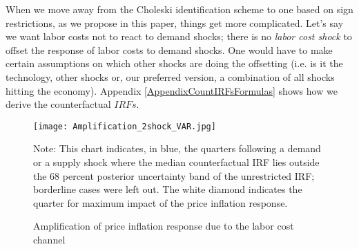 \documentclass[11pt]{article}
\begin{document}
When we move away from the Choleski identification scheme to one based on sign restrictions, as we propose in this paper, things get more complicated. Let's say we want labor costs not to react to demand shocks; there is no \textit{labor cost shock} to offset the response of labor costs to demand shocks. One would have to make certain assumptions on which other shocks are doing the offsetting (i.e. is it the technology, other shocks or, our preferred version, a combination of all shocks hitting the economy). Appendix \ref{AppendixCountIRFsFormulas} shows how we derive the counterfactual $IRFs$.



\begin{figure}
\begin{center}
\caption{Amplification of price inflation response due to the labor cost channel}

\smallskip
\texttt{[image: Amplification\_2shock\_VAR.jpg]}\label{fig:2ShockVAR_CounterIRF}
 \begin{minipage}{\textwidth} {\footnotesize
 Note: This chart indicates, in blue, the quarters following a demand or a supply shock where the median counterfactual IRF lies outside the 68 percent posterior uncertainty band of the unrestricted IRF; borderline cases were left out. The white diamond indicates the quarter for maximum impact of the price inflation response.\par}
 \end{minipage}
\end{center}
\end{figure}
\end{document}
